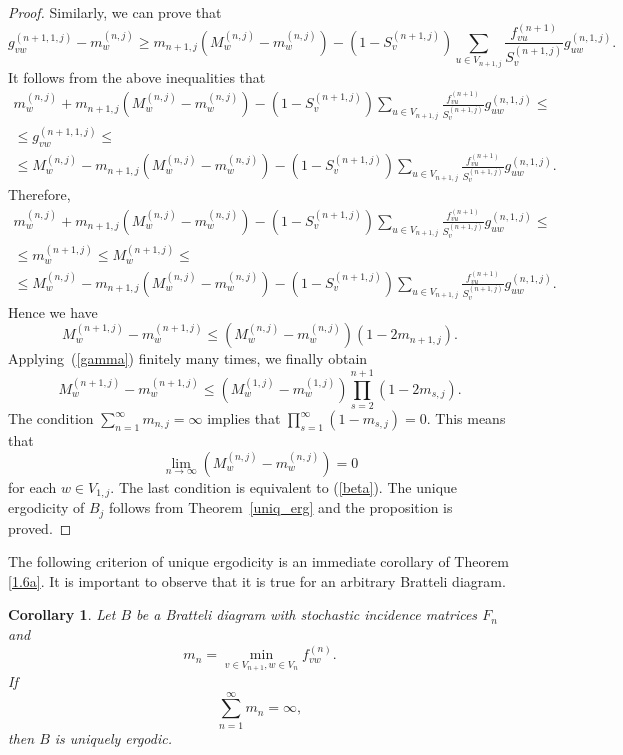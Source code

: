\documentclass[11pt, english, reqno]{amsart}
\theoremstyle{definition}
\theoremstyle{remark}
\theoremstyle{plain}
\newtheorem{corol}[defin]{Corollary}
\numberwithin{equation}{section}
\begin{document}
{\begin{proof}
Similarly, we can prove that
$$
g_{vw}^{(n+1,1,j)} - m_w^{(n,j)} \geq m_{n+1,j}(M_w^{(n,j)} - m_w^{(n,j)})
- (1 - S_{v}^{(n+1,j)})\sum_{u \in V_{n+1,j}} \frac{f_{vu}^{(n+1)}}
{S_{v}^{(n+1,j)}} g_{uw}^{(n,1,j)}.
$$
It follows from the above inequalities that
\begin{multline*}
m_w^{(n,j)} + m_{n+1,j} (M_w^{(n,j)} - m_w^{(n,j)}) - (1 - S_{v}^{(n+1,j)})
\sum_{u \in V_{n+1,j}} \frac{f_{vu}^{(n+1)}}{S_{v}^{(n+1,j)}} g_{uw}^{(n,
1,j)} \leq\\
\leq  g_{vw}^{(n+1,1,j)} \leq \\
\leq M_w^{(n,j)} - m_{n+1,j}(M_w^{(n,j)} - m_w^{(n,j)}) - (1 - S_{v}^{(n+1,j)})
\sum_{u \in V_{n+1,j}} \frac{f_{vu}^{(n+1)}}{S_{v}^{(n+1,j)}} g_{uw}^{(n,
1,j)}.
\end{multline*}
Therefore,
\begin{multline*}
m_w^{(n,j)} + m_{n+1,j}(M_w^{(n,j)} - m_w^{(n,j)})  - (1 - S_{v}^{(n+1,j)})
\sum_{u \in V_{n+1,j}} \frac{f_{vu}^{(n+1)}}{S_{v}^{(n+1,j)}} g_{uw}^{(n,
1,j)} \leq\\
\leq m_w^{(n+1,j)} \leq M_w^{(n+1,j)} \leq\\
\leq M_w^{(n,j)} - m_{n+1,j}(M_w^{(n,j)} - m_w^{(n,j)})  - (1 - S_{v}^{(n+1,j)})
\sum_{u \in V_{n+1,j}} \frac{f_{vu}^{(n+1)}}{S_{v}^{(n+1,j)}} g_{uw}^{(n,
1,j)}.
\end{multline*}
Hence we have
\begin{equation}\label{gamma}
M_w^{(n+1,j)} - m_w^{(n+1,j)} \leq (M_w^{(n,j)} - m_w^{(n,j)})(1 - 2 m_{n
+1,j}).
\end{equation}
Applying~(\ref{gamma}) finitely many times, we finally obtain
$$
M_w^{(n+1,j)} - m_w^{(n+1,j)} \leq (M_w^{(1,j)} - m_w^{(1,j)})
\prod_{s = 2}^{n+1} (1 - 2 m_{s,j}).
$$
The condition $\sum_{n=1}^\infty m_{n,j} = \infty$ implies that
$\prod_{s = 1}^{\infty} (1 - m_{s,j}) = 0$. This means that
$$
\lim_{n \rightarrow \infty}(M_w^{(n,j)} - m_w^{(n,j)}) = 0
$$
for each $w \in V_{1,j}$. The last condition is equivalent to (\ref{beta}). The unique ergodicity of $B_j$ follows from Theorem~\ref{uniq_erg} and the proposition is proved.

\end{proof}

The following criterion of unique ergodicity is an immediate  corollary of
Theorem \ref{1.6a}. It is important to observe that it is true for an
arbitrary Bratteli diagram.

\begin{corol}
Let $B$ be a Bratteli diagram with stochastic incidence matrices $F_n$ and
 $$
 m_n = \min_{v \in V_{n+1}, w \in V_n} f_{vw}^{(n)}.
 $$
 If  
 $$
 \sum_{n = 1}^{\infty} m_n = \infty,
 $$ 
 then $B$ is uniquely ergodic.
\end{corol}

}
\end{document}
